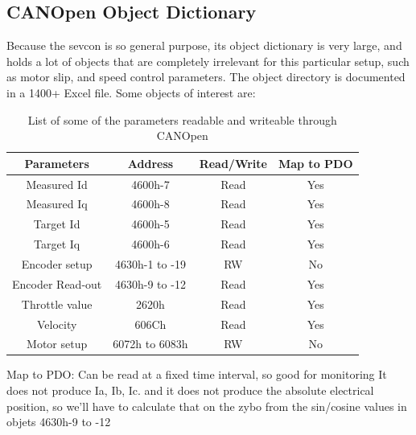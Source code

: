 \subsection{CANOpen Object Dictionary}\label{sub:sevcon_object_dictionary}
Because the sevcon is so general purpose, its object dictionary is very large, and holds a lot of objects that are completely irrelevant for this particular setup, such as motor slip, and speed control parameters. 
The object directory is documented in a 1400+ Excel file. 
Some objects of interest are:

\begin{table}
	\centering
	\begin{tabular}{| c | c | c | c |}
		\hline
		Parameters & Address & Read/Write & Map to PDO \\ %
		\hline
		Measured Id & 4600h-7 & Read & Yes \\ %
		Measured Iq & 4600h-8 & Read & Yes \\ %
		Target Id & 4600h-5 & Read & Yes \\ %
		Target Iq & 4600h-6 & Read & Yes \\ %
		Encoder setup & 4630h-1 to -19 & RW & No \\%
		Encoder Read-out & 4630h-9 to -12 & Read & Yes \\ %
		Throttle value & 2620h & Read & Yes \\ %
		Velocity & 606Ch & Read & Yes \\ %
		Motor setup & 6072h to 6083h & RW & No \\ %
		\hline	
	\end{tabular}
	\caption{List of some of the parameters readable and writeable through CANOpen}
	\label{tab:parameters_of_interest}
\end{table}

Map to PDO: Can be read at a fixed time interval, so good for monitoring
It does not produce Ia, Ib, Ic. and it does not produce the absolute electrical position, so we'll have to calculate that on the zybo from the sin/cosine values in objets 4630h-9 to -12


